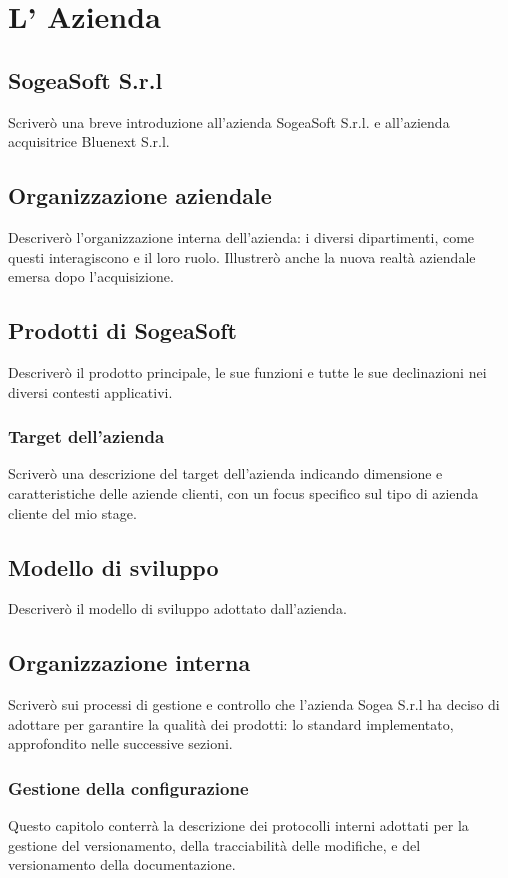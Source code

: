 \chapter{L' Azienda}
    \section{SogeaSoft S.r.l}
    Scriverò una breve introduzione all’azienda SogeaSoft S.r.l. e all’azienda acquisitrice Bluenext S.r.l.
    
    \section{Organizzazione aziendale}
    Descriverò l’organizzazione interna dell’azienda: i diversi dipartimenti, come questi interagiscono e il loro ruolo. Illustrerò anche la nuova realtà aziendale emersa dopo l’acquisizione.
    \section{Prodotti di SogeaSoft}
    Descriverò il prodotto principale, le sue funzioni e tutte le sue declinazioni nei diversi contesti
    applicativi.
        \subsection{Target dell'azienda}
        Scriverò una descrizione del target dell’azienda indicando dimensione e caratteristiche delle
        aziende clienti, con un focus specifico sul tipo di azienda cliente del mio stage.
    \section{Modello di sviluppo}
    Descriverò il modello di sviluppo adottato dall’azienda.
    \section{Organizzazione interna}
    Scriverò sui processi di gestione e controllo che l’azienda Sogea S.r.l ha deciso di adottare per
    garantire la qualità dei prodotti: lo standard implementato, approfondito nelle successive sezioni.
        \subsection{Gestione della configurazione}
        Questo capitolo conterrà la descrizione dei protocolli interni adottati per la gestione del
        versionamento, della tracciabilità delle modifiche, e del versionamento della documentazione.
